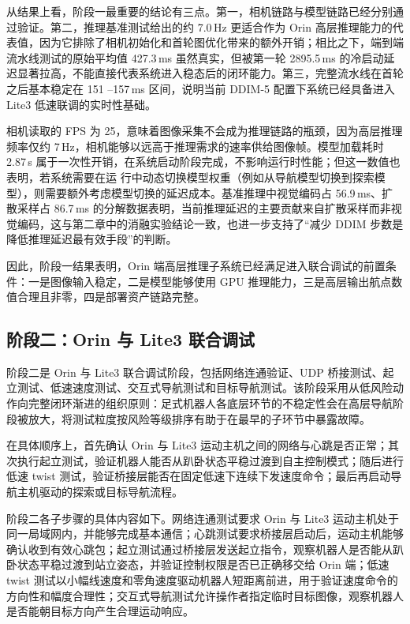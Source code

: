 从结果上看，阶段一最重要的结论有三点。第一，相机链路与模型链路已经分别通过验证。第二，推理基准测试给出的约 7.0\,Hz
更适合作为 Orin 高层推理能力的代表值，因为它排除了相机初始化和首轮图优化带来的额外开销；相比之下，端到端流水线测试的原始平均值
427.3\,ms 虽然真实，但被第一轮 2895.5\,ms 的冷启动延迟显著拉高，不能直接代表系统进入稳态后的闭环能力。第三，完整流水线在首轮之后基本稳定在 151
--157\,ms 区间，说明当前 DDIM-5 配置下系统已经具备进入 Lite3 低速联调的实时性基础。

相机读取的 FPS 为 25，意味着图像采集不会成为推理链路的瓶颈，因为高层推理频率仅约
7\,Hz，相机能够以远高于推理需求的速率供给图像帧。模型加载耗时 2.87\,s 属于一次性开销，在系统启动阶段完成，不影响运行时性能；但这一数值也表明，若系统需要在运
行中动态切换模型权重（例如从导航模型切换到探索模型），则需要额外考虑模型切换的延迟成本。基准推理中视觉编码占 56.9\,ms、扩散采样占 86.7\,ms
的分解数据表明，当前推理延迟的主要贡献来自扩散采样而非视觉编码，这与第二章中的消融实验结论一致，也进一步支持了``减少 DDIM 步数是降低推理延迟最有效手段''的判断。

因此，阶段一结果表明，Orin 端高层推理子系统已经满足进入联合调试的前置条件：一是图像输入稳定，二是模型能够使用 GPU 推理能力，三是高层输出航点数值合理且非零，四是部署资产链路完整。

\subsection{阶段二：Orin 与 Lite3 联合调试}

阶段二是 Orin 与 Lite3 联合调试阶段，包括网络连通验证、UDP 桥接测试、起立测试、低速速度测试、交互式导航测试和目标导航测试。该阶段采用从低风险动作向完整闭环渐进的组织原则：足式机器人各底层环节的不稳定性会在高层导航阶段被放大，将测试粒度按风险等级排序有助于在最早的子环节中暴露故障。

在具体顺序上，首先确认 Orin 与 Lite3 运动主机之间的网络与心跳是否正常；其次执行起立测试，验证机器人能否从趴卧状态平稳过渡到自主控制模式；随后进行低速 twist 测试，验证桥接层能否在固定低速下连续下发速度命令；最后再启动导航主机驱动的探索或目标导航流程。

阶段二各子步骤的具体内容如下。网络连通测试要求 Orin 与 Lite3 运动主机处于同一局域网内，并能够完成基本通信；心跳测试要求桥接层启动后，运动主机能够确认收到有效心跳包；起立测试通过桥接层发送起立指令，观察机器人是否能从趴卧状态平稳过渡到站立姿态，并验证控制权限是否已正确移交给 Orin 端；低速 twist 测试以小幅线速度和零角速度驱动机器人短距离前进，用于验证速度命令的方向性和幅度合理性；交互式导航测试允许操作者指定临时目标图像，观察机器人是否能朝目标方向产生合理运动响应。

